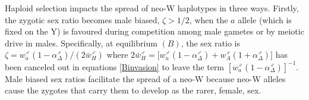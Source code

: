 \documentclass[12pt]{article}
\begin{document}

Haploid selection impacts the spread of neo-W haplotypes in three ways.
Firstly, the zygotic sex ratio becomes male biased, $\zeta>1/2$, when the $a$ allele (which is fixed on the Y) is favoured during competition among male gametes or by meiotic drive in males.
Specifically, at equilibrium $(B)$, the sex ratio is $\zeta = w_a^\male (1-\alpha^\male_\Delta) / (2\bar{w}_{H}^\male)$ where $2\bar{w}_{H}^\male= \big[w_a^\male (1-\alpha^\male_\Delta) +  w_A^\male (1+\alpha^\male_\Delta) \big]$ has been canceled out in equations \eqref{Binvasion} to leave the term $\left[w_{a}^\male (1-\alpha^\male_\Delta) \right]^{-1}$. 
Male biased sex ratios facilitate the spread of a neo-W because neo-W alleles cause the zygotes that carry them to develop as the rarer, female, sex. 
\end{document}
